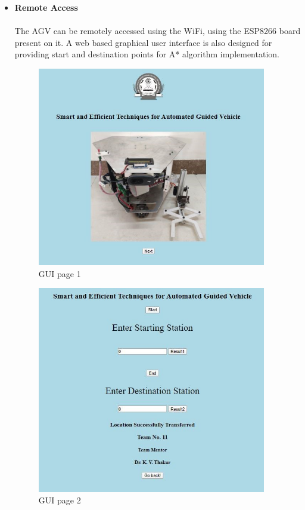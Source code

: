 \begin{itemize}[wide, labelwidth=!, labelindent=0pt]
    \newpage
    
    \item \textbf{Remote Access}
    \vspace{-0.5cm}
    \paragraph{}The AGV can be remotely accessed using the WiFi, using the ESP8266 board present on it. A web based graphical user interface is also designed for providing start and destination points for A* algorithm implementation.
    
    \begin{figure}[H]
    \centering
    \includegraphics[width = 10cm]{project/images/gui_page1.jpg}
    \caption{GUI page 1}
    \end{figure}
    
    
    \begin{figure}[H]
    \centering
    \includegraphics[width = 10cm]{project/images/gui_page2.jpg}
    \caption{GUI page 2}
    \end{figure}
    

\end{itemize}
